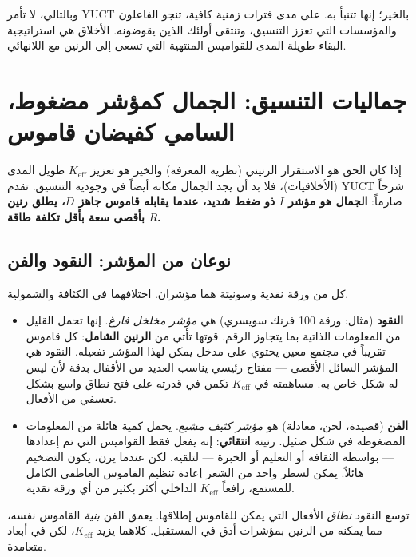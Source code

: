 \documentclass[12pt,a4paper]{article}
\begin{document}
	وبالتالي، لا تأمر YUCT بالخير؛ إنها تتنبأ به. على مدى فترات زمنية كافية، تنجو الفاعلون والمؤسسات التي تعزز التنسيق، وتنتقى أولئك الذين يقوضونه. الأخلاق هي استراتيجية البقاء طويلة المدى للقواميس المنتهية التي تسعى إلى الرنين مع اللانهائي.
	
	\section{جماليات التنسيق: الجمال كمؤشر مضغوط، السامي كفيضان قاموس}
	\label{sec:coordination-aesthetics}
	
	إذا كان الحق هو الاستقرار الرنيني (نظرية المعرفة) والخير هو تعزيز \(K_{\mathrm{eff}}\) طويل المدى (الأخلاقيات)، فلا بد أن يجد الجمال مكانه أيضاً في وجودية التنسيق. تقدم YUCT شرحاً صارماً: \textbf{الجمال هو مؤشر \(I\) ذو ضغط شديد، عندما يقابله قاموس جاهز \(D\)، يطلق رنين \(R\) بأقصى سعة بأقل تكلفة طاقة.}
	
	\subsection{نوعان من المؤشر: النقود والفن}
	
	كل من ورقة نقدية وسونيتة هما مؤشران. اختلافهما في الكثافة والشمولية.
	
	\begin{itemize}[leftmargin=*]
		\item \textbf{النقود} (مثال: ورقة 100 فرنك سويسري) هي \emph{مؤشر مخلخل فارغ}. إنها تحمل القليل من المعلومات الذاتية بما يتجاوز الرقم. قوتها تأتي من \textbf{الرنين الشامل}: كل قاموس تقريباً في مجتمع معين يحتوي على مدخل يمكن لهذا المؤشر تفعيله. النقود هي المؤشر السائل الأقصى — مفتاح رئيسي يناسب العديد من الأقفال بدقة لأن ليس له شكل خاص به. مساهمته في \(K_{\mathrm{eff}}\) تكمن في قدرته على فتح نطاق واسع بشكل تعسفي من الأفعال.
		\item \textbf{الفن} (قصيدة، لحن، معادلة) هو \emph{مؤشر كثيف مشبع}. يحمل كمية هائلة من المعلومات المضغوطة في شكل ضئيل. رنينه \textbf{انتقائي}: إنه يفعل فقط القواميس التي تم إعدادها — بواسطة الثقافة أو التعليم أو الخبرة — لتلقيه. لكن عندما يرن، يكون التضخيم هائلاً. يمكن لسطر واحد من الشعر إعادة تنظيم القاموس العاطفي الكامل للمستمع، رافعاً \(K_{\mathrm{eff}}\) الداخلي أكثر بكثير من أي ورقة نقدية.
	\end{itemize}
	
	توسع النقود \emph{نطاق} الأفعال التي يمكن للقاموس إطلاقها. يعمق الفن \emph{بنية} القاموس نفسه، مما يمكنه من الرنين بمؤشرات أدق في المستقبل. كلاهما يزيد \(K_{\mathrm{eff}}\)، لكن في أبعاد متعامدة.
	
\end{document}
